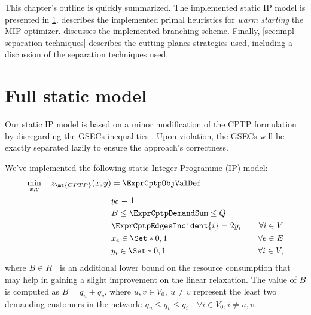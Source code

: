 \medskip

This chapter's outline is quickly summarized.
The implemented static IP model is presented in \cref{sec:impl-full-static-model}.
 describes the implemented primal heuristics for \textit{warm starting} the MIP optimizer.
 discusses the implemented branching scheme.
Finally, \cref{sec:impl-separation-techniques} describes the cutting planes strategies used, including a discussion of the separation techniques used.

\section{Full static model}
\label{sec:impl-full-static-model}

Our static IP model is based on a minor modification of the CPTP formulation
by disregarding the GSECs inequalities .
Upon violation,
the GSECs will be exactly separated lazily to ensure the approach's correctness.

We've implemented the following static Integer Programme (IP) model:
\begin{align}
	\min_{x,y} \quad z_\mt{CPTP}(x, y) & = \ExprCptpObjValDef                     & \label{eq:cptp-static-model-0}                         \\
	                                   & y_0 = 1                                  & \label{eq:cptp-static-model-1}                         \\
	                                   & B \le   \ExprCptpDemandSum   \le Q       & \label{eq:cptp-static-model-2}                         \\
	                                   & \ExprCptpEdgesIncident{i}    = 2 y_i     & \quad \forall i \in V  \label{eq:cptp-static-model-3}  \\
	                                   & x_{e}                   \in \Set*{0, 1}  & \quad \forall e \in E  \label{eq:cptp-static-model-4}  \\
	                                   & y_{i}                    \in \Set*{0, 1} & \quad \forall i \in V  \label{eq:cptp-static-model-5},
\end{align}
where
$B \in R_+$ is an additional lower bound on the resource consumption
that may help in gaining a slight improvement on the linear relaxation.
The value of $B$ is computed as $B = q_u + q_v$, where $u, v \in V_0,\ u \ne v$
represent the least two demanding customers in the network:
$q_u \le q_v \le q_i \quad \forall i \in V_0, i \ne u, v$.

